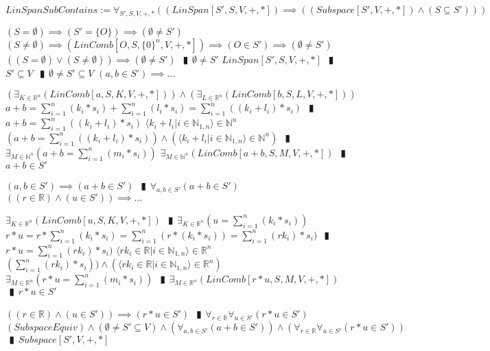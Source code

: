 \documentclass{book}
\newcommand{\abr}{:=}
\newcommand{\pipe}{$\phantom{(}\vrectangleblack\phantom{)}$}
\begin{document}
$LinSpanSubContains \abr \forall_{S', S, V, +, *}((LinSpan[S', S, V, +, *]) \implies ((Subspace[S', V, +, *]) \land (S \subseteq S')))$
\begin{enumerate}
  \lit $(S = \emptyset) \implies (S' = \{O\}) \implies (\emptyset \neq S')$
  \lit $(S \neq \emptyset) \implies (LinComb[O, S, \{0\}^n, V, +, *]) \implies (O \in S') \implies (\emptyset \neq S')$
  \lit $((S = \emptyset) \lor (S \neq \emptyset)) \implies (\emptyset \neq S')$ \pipe $\emptyset \neq S'$
  \lit $LinSpan[S', S, V, +, *]$ \pipe $S' \subseteq V$ \pipe $\emptyset \neq S' \subseteq V$
  \lit $(a, b \in S') \implies \ldots$
  \begin{enumerate}
    \lit $(\exists_{K \in \mathbb{R}^n}(LinComb[a, S, K, V, +, *])) \land (\exists_{L \in \mathbb{R}^n}(LinComb[b, S, L, V, +, *]))$
    \lit $a + b = \sum_{i = 1}^{n}(k_i * s_i) + \sum_{i = 1}^{n}(l_i * s_i) = \sum_{i = 1}^{n}((k_i + l_i) * s_i)$ \pipe $a + b = \sum_{i = 1}^{n}((k_i + l_i) * s_i)$
    \lit $\langle k_i + l_i | i \in \mathbb{N}_{1, n} \rangle \in \mathbb{N}^n$
    \lit $(a + b = \sum_{i = 1}^{n}((k_i + l_i) * s_i)) \land (\langle k_i + l_i | i \in \mathbb{N}_{1, n} \rangle \in \mathbb{N}^n)$ \pipe $\exists_{M \in \mathbb{N}^n}(a + b = \sum_{i = 1}^{n}(m_i * s_i))$
    \lit $\exists_{M \in \mathbb{N}^n}(LinComb[a + b, S, M, V, +, *])$ \pipe $a + b \in S'$
  \end{enumerate}
  \lit $(a, b \in S') \implies (a + b \in S')$ \pipe $\forall_{a, b \in S'}(a + b \in S')$
  \lit $((r \in \mathbb{R}) \land (u \in S')) \implies \ldots$
  \begin{enumerate}
    \lit $\exists_{K \in \mathbb{R}^n}(LinComb[u, S, K, V, +, *])$ \pipe $\exists_{K \in \mathbb{R}^n}(u = \sum_{i = 1}^{n}(k_i * s_i))$
    \lit $r * u = r * \sum_{i = 1}^{n}(k_i * s_i) = \sum_{i = 1}^{n}(r * (k_i * s_i)) = \sum_{i = 1}^{n}(r k_i) * s_i)$ \pipe $r * u = \sum_{i = 1}^{n}(r k_i) * s_i)$
    \lit $\langle r k_i \in \mathbb{R} | i \in \mathbb{N}_{1, n} \rangle \in \mathbb{R}^n$
    \lit $(\sum_{i = 1}^{n}(r k_i) * s_i)) \land (\langle r k_i \in \mathbb{R} | i \in \mathbb{N}_{1, n} \rangle \in \mathbb{R}^n)$
    \lit $\exists_{M \in \mathbb{R}^n}(r * u = \sum_{i = 1}^{n}(m_i * s_i))$ \pipe $\exists_{M \in \mathbb{R}^n}(LinComb[r * u, S, M, V, +, *])$ \pipe $r * u \in S'$
  \end{enumerate}
  \lit $((r \in \mathbb{R}) \land (u \in S')) \implies (r * u \in S')$ \pipe $\forall_{r \in \mathbb{R}} \forall_{u \in S'}(r * u \in S')$
  \lit $(SubspaceEquiv) \land (\emptyset \neq S' \subseteq V) \land (\forall_{a, b \in S'}(a + b \in S')) \land (\forall_{r \in \mathbb{R}} \forall_{u \in S'}(r * u \in S'))$ \pipe $Subspace[S', V, +, *]$

\end{enumerate}
\end{document}
